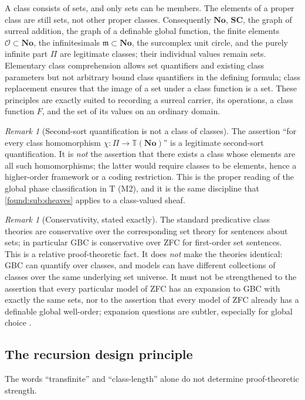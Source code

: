 \documentclass[11pt,letterpaper]{article}
\numberwithin{equation}{section}
\theoremstyle{definition}
\theoremstyle{remark}
\newtheorem{remark}[theorem]{Remark}
\newcommand{\No}{\mathbf{No}}
\newcommand{\SC}{\mathbf{SC}}
\newcommand{\OO}{\mathcal O}
\newcommand{\mm}{\mathfrak m}
\begin{document}
A class consists of sets, and only sets can be members. The elements of a
proper class are still sets, not other proper classes. Consequently $\No$,
$\SC$, the graph of surreal addition, the graph of a definable global function,
the finite elements $\OO\subset\No$, the infinitesimals $\mm\subset\No$, the
surcomplex unit circle, and the purely infinite part $\Pi$ are legitimate
classes; their individual values remain sets. Elementary class comprehension
allows set quantifiers and existing class parameters but not arbitrary bound
class quantifiers in the defining formula; class replacement ensures that the
image of a set under a class function is a set. These principles are exactly
suited to recording a surreal carrier, its operations, a class function $F$,
and the set of its values on an ordinary domain.

\begin{remark}[Second-sort quantification is not a class of classes]\label{found:rem:secondsort}
The assertion ``for every class homomorphism $\chi:\Pi\to\mathbb T(\No)$'' is a
legitimate second-sort quantification. It is \emph{not} the assertion that
there exists a class whose elements are all such homomorphisms; the latter
would require classes to be elements, hence a higher-order framework or a
coding restriction. This is the proper reading of the global phase
classification in T (M2), and it is the same discipline that
\cref{found:sub:sheaves} applies to a class-valued sheaf.
\end{remark}

\begin{remark}[Conservativity, stated exactly]\label{found:rem:conservativity}
The standard predicative class theories are conservative over the corresponding
set theory for sentences about sets; in particular GBC is conservative over ZFC
for first-order set sentences. This is a relative proof-theoretic fact. It does
\emph{not} make the theories identical: GBC can quantify over classes, and
models can have different collections of classes over the same underlying set
universe. It must not be strengthened to the assertion that every particular
model of ZFC has an expansion to GBC with exactly the same sets, nor to the
assertion that every model of ZFC already has a definable global well-order;
expansion questions are subtler, especially for global choice
\cite{found:Williams,found:WilliamsMin,found:ShulmanSize}.
\end{remark}

\subsection{The recursion design principle}
\label{found:sub:recursionprinciple}
The words ``transfinite'' and ``class-length'' alone do not determine
proof-theoretic strength.
\end{document}
